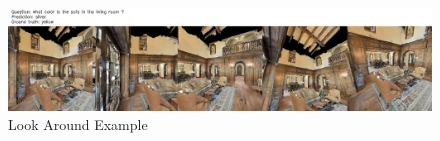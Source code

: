 \begin{figure}[H]
	\centering
	\includegraphics[width=\textwidth]{./figure/lookaroundexample.jpg}
	\caption{Look Around Example}
	\label{fig:look_around}
\end{figure}


